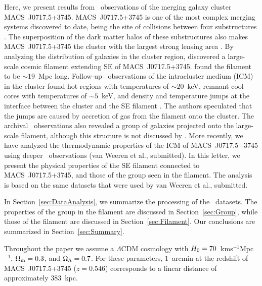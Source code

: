 Here, we present results from \chandra\ observations of the merging galaxy cluster MACS~J0717.5+3745. MACS~J0717.5+3745 \citep[$z=0.546$;][]{Ebeling2001, Ebeling2007} is one of the most complex merging systems discovered to date, being the site of collisions between four substructures \citep{Ma2009, Medezinski2013}. The superposition of the dark matter halos of these substructures also makes MACS~J0717.5+3745 the cluster with the largest strong lensing area \citep{Zitrin2009, Medezinski2013,Umetsu2014, Umetsu2016}. By analyzing the distribution of galaxies in the cluster region, \citet{Ebeling2004} discovered a large-scale cosmic filament extending SE of MACS~J0717.5+3745. \citet{Jauzac2012} found the filament to be $\sim 19$~Mpc long. Follow-up \chandra\ observations of the intracluster medium (ICM) in the cluster found hot regions with temperatures of $\sim 20$~keV, remnant cool cores with temperatures of $\sim 5$~keV, and density and temperature jumps at the interface between the cluster and the SE filament \citet{Ma2009}. The authors speculated that the jumps are caused by accretion of gas from the filament onto the cluster. The archival \chandra\ observations also revealed a group of galaxies projected onto the large-scale filament, although this structure is not discussed by \citet{Ma2009}. More recently, we have analyzed the thermodynamic properties of the ICM of MACS~J0717.5+3745 using deeper \chandra\ observations (van Weeren et al., submitted). In this letter, we present the physical properties of the SE filament connected to MACS~J0717.5+3745, and those of the group seen in the filament. The analysis is based on the same datasets that were used by van Weeren et al., submitted.

In Section~\ref{sec:DataAnalysis}, we summarize the processing of the \chandra\ datasets. The properties of the group in the filament are discussed in Section~\ref{sec:Group}, while those of the filament are discussed in Section~\ref{sec:Filament}. Our conclusions are summarized in Section~\ref{sec:Summary}.

Throughout the paper we assume a $\Lambda$CDM cosmology with $H_{\rm 0} = 70$~km\;s$^{-1}$\;Mpc$^{-1}$, $\Omega_{\rm m} = 0.3$, and $\Omega_{\rm \Lambda} = 0.7$. For these parameters, 1~arcmin at the redshift of MACS~J0717.5+3745 ($z=0.546$) corresponds to a linear distance of approximately 383~kpc. 
